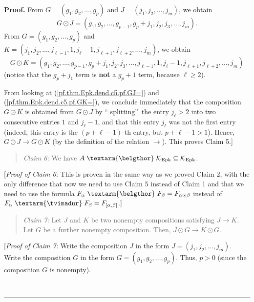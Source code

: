 \documentclass[numbers=enddot,12pt,final,onecolumn,notitlepage]{scrartcl}%
\theoremstyle{definition}
\newenvironment{statement}{\begin{quote}}{\end{quote}}
\newenvironment{proof}[1][Proof]{\noindent\textbf{#1.} }{\ \rule{0.5em}{0.5em}}
\newenvironment{verlong}{}{}
\newcommand{\tvi}{\left. \textarm{\tvimadur} \right.}
\newcommand{\bel}{\left. \textarm{\belgthor} \right.}
\begin{document}
\begin{verlong}
\begin{proof}
From $G=\left(  g_{1},g_{2},\ldots,g_{p}\right)  $ and $J=\left(  j_{1}%
,j_{2},\ldots,j_{m}\right)  $, we obtain%
\begin{equation}
G\odot J=\left(  g_{1},g_{2},\ldots,g_{p-1},g_{p}+j_{1},j_{2},j_{3}%
,\ldots,j_{m}\right)  . \label{pf.thm.Epk.dend.c5.pf.GJ=}%
\end{equation}
From $G=\left(  g_{1},g_{2},\ldots,g_{p}\right)  $ and $K=\left(  j_{1}%
,j_{2},\ldots,j_{\ell-1},1,j_{\ell}-1,j_{\ell+1},j_{\ell+2},\ldots
,j_{m}\right)  $, we obtain%
\begin{equation}
G\odot K=\left(  g_{1},g_{2},\ldots,g_{p-1},g_{p}+j_{1},j_{2},j_{3}%
,\ldots,j_{\ell-1},1,j_{\ell}-1,j_{\ell+1},j_{\ell+2},\ldots,j_{m}\right)
\label{pf.thm.Epk.dend.c5.pf.GK=}%
\end{equation}
(notice that the $g_{p}+j_{1}$ term is \textbf{not} a $g_{p}+1$ term, because
$\ell\geq2$).

From looking at (\ref{pf.thm.Epk.dend.c5.pf.GJ=}) and
(\ref{pf.thm.Epk.dend.c5.pf.GK=}), we conclude immediately that the
composition $G\odot K$ is obtained from $G\odot J$ by \textquotedblleft
splitting\textquotedblright\ the entry $j_{\ell}>2$ into two consecutive
entries $1$ and $j_{\ell}-1$, and that this entry $j_{\ell}$ was not the first
entry (indeed, this entry is the $\left(  p+\ell-1\right)  $-th entry, but
$p+\ell-1>1$). Hence, $G\odot J\rightarrow G\odot K$ (by the definition of the
relation $\rightarrow$). This proves Claim 5.]

\begin{statement}
\textit{Claim 6:} We have $A\bel\mathcal{K}_{\operatorname*{Epk}}%
\subseteq\mathcal{K}_{\operatorname*{Epk}}$.
\end{statement}

[\textit{Proof of Claim 6:} This is proven in the same way as we proved Claim
2, with the only difference that now we need to use Claim 5 instead of Claim 1
and that we need to use the formula $F_{\alpha}\bel  F_{\beta}=F_{\alpha
\odot\beta}$ instead of $F_{\alpha}\tvi  F_{\beta}=F_{\left[  \alpha
,\beta\right]  }$.]

\begin{statement}
\textit{Claim 7:} Let $J$ and $K$ be two nonempty compositions satisfying
$J\rightarrow K$. Let $G$ be a further nonempty composition. Then, $J\odot
G\rightarrow K\odot G$.
\end{statement}

[\textit{Proof of Claim 7:} Write the composition $J$ in the form $J=\left(
j_{1},j_{2},\ldots,j_{m}\right)  $. Write the composition $G$ in the form
$G=\left(  g_{1},g_{2},\ldots,g_{p}\right)  $. Thus, $p>0$ (since the
composition $G$ is nonempty).


\end{proof}
\end{verlong}
\end{document}
